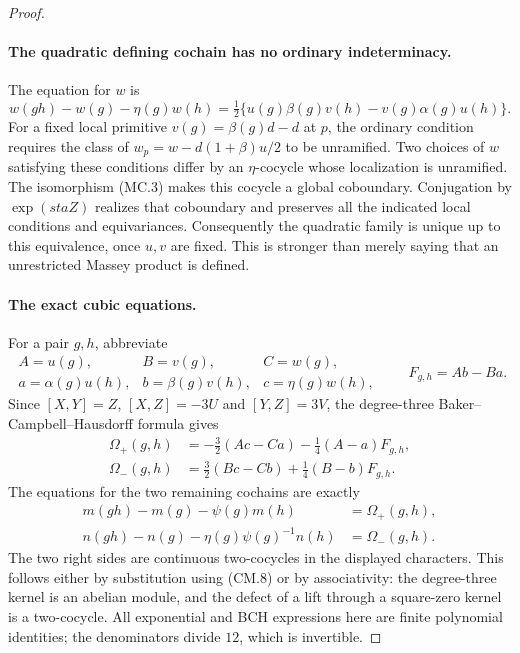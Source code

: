\begin{proof}
\paragraph{The quadratic defining cochain has no ordinary indeterminacy.}
The equation for $w$ is
\[
 w(gh)-w(g)-\eta(g)w(h)
  =\tfrac12\{u(g)\beta(g)v(h)-v(g)\alpha(g)u(h)\}.         \tag{CM.8}
\]
For a fixed local primitive $v(g)=\beta(g)d-d$ at $p$,
the ordinary condition requires the class of
$w_p=w-d(1+\beta)u/2$ to be unramified.
Two choices of $w$ satisfying these conditions differ by an
$\eta$-cocycle whose localization is unramified.  The
isomorphism (MC.3) makes this cocycle a global coboundary.
Conjugation by $\exp(st aZ)$ realizes that coboundary and
preserves all the indicated local conditions and equivariances.
Consequently the quadratic family is unique up to this
equivalence, once $u,v$ are fixed.  This is stronger than
merely saying that an unrestricted Massey product is defined.

\paragraph{The exact cubic equations.}
For a pair $g,h$, abbreviate
\[
\begin{array}{lll}
 A=u(g),&B=v(g),&C=w(g),\\
 a=\alpha(g)u(h),&b=\beta(g)v(h),&c=\eta(g)w(h),
\end{array}
\qquad F_{g,h}=Ab-Ba.                                   \tag{CM.9}
\]
Since
$[X,Y]=Z$, $[X,Z]=-3U$ and $[Y,Z]=3V$, the degree-three
Baker--Campbell--Hausdorff formula gives
\[
\begin{split}
 \Omega_+(g,h)&=-\tfrac32(Ac-Ca)
                         -\tfrac14(A-a)F_{g,h},\\
 \Omega_-(g,h)&=\tfrac32(Bc-Cb)
                         +\tfrac14(B-b)F_{g,h}.
\end{split}                                                   \tag{CM.10}
\]
The equations for the two remaining cochains are exactly
\[
\begin{split}
 m(gh)-m(g)-\psi(g)m(h)&=\Omega_+(g,h),\\
 n(gh)-n(g)-\eta(g)\psi(g)^{-1}n(h)&=\Omega_-(g,h).
\end{split}                                                   \tag{CM.11}
\]
The two right sides are continuous two-cocycles in the displayed
characters.  This follows either by substitution using (CM.8)
or by associativity: the degree-three kernel is an abelian
module, and the defect of a lift through a square-zero kernel
is a two-cocycle.  All exponential and BCH expressions here
are finite polynomial identities; the denominators divide
$12$, which is invertible.


\end{proof}
